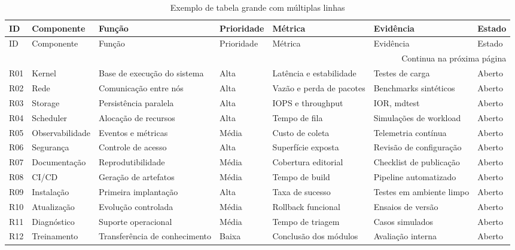 {\scriptsize
\setlength{\tabcolsep}{3pt}
\begin{longtable}{p{}p{}p{}p{}p{}p{}p{}}
\caption{Exemplo de tabela grande com múltiplas linhas}\label{tab:grande}\\
\toprule
ID & Componente & Função & Prioridade & Métrica & Evidência & Estado \\
\midrule
\endfirsthead
\toprule
ID & Componente & Função & Prioridade & Métrica & Evidência & Estado \\
\midrule
\endhead
\midrule
\multicolumn{7}{r}{Continua na próxima página}\\
\endfoot
\bottomrule
\endlastfoot
R01 & Kernel & Base de execução do sistema & Alta & Latência e estabilidade & Testes de carga & Aberto \\
R02 & Rede & Comunicação entre nós & Alta & Vazão e perda de pacotes & Benchmarks sintéticos & Aberto \\
R03 & Storage & Persistência paralela & Alta & IOPS e throughput & IOR, mdtest & Aberto \\
R04 & Scheduler & Alocação de recursos & Alta & Tempo de fila & Simulações de workload & Aberto \\
R05 & Observabilidade & Eventos e métricas & Média & Custo de coleta & Telemetria contínua & Aberto \\
R06 & Segurança & Controle de acesso & Alta & Superfície exposta & Revisão de configuração & Aberto \\
R07 & Documentação & Reprodutibilidade & Média & Cobertura editorial & Checklist de publicação & Aberto \\
R08 & CI/CD & Geração de artefatos & Média & Tempo de build & Pipeline automatizado & Aberto \\
R09 & Instalação & Primeira implantação & Alta & Taxa de sucesso & Testes em ambiente limpo & Aberto \\
R10 & Atualização & Evolução controlada & Média & Rollback funcional & Ensaios de versão & Aberto \\
R11 & Diagnóstico & Suporte operacional & Média & Tempo de triagem & Casos simulados & Aberto \\
R12 & Treinamento & Transferência de conhecimento & Baixa & Conclusão dos módulos & Avaliação interna & Aberto \\
\end{longtable}
}
